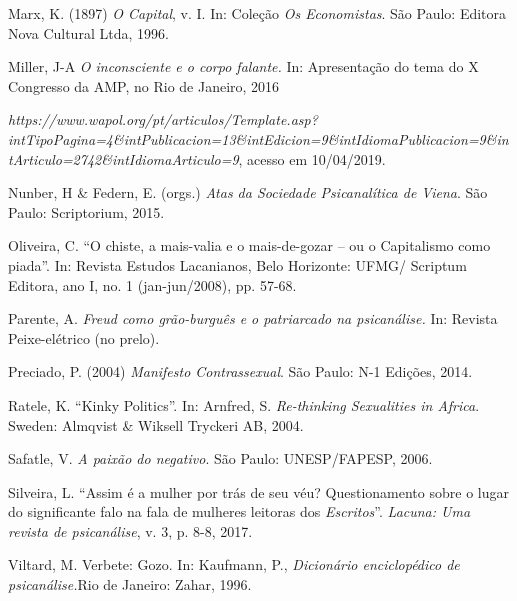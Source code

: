 Marx, K. (1897) \emph{O Capital}, v. I. In: Coleção \emph{Os
Economistas}. São Paulo: Editora Nova Cultural Ltda, 1996.

Miller, J-A \emph{O inconsciente e o corpo falante.} In: Apresentação do
tema do X Congresso da AMP, no Rio de Janeiro, 2016

\emph{https://www.wapol.org/pt/articulos/Template.asp?intTipoPagina=4\&intPublicacion=13\&intEdicion=9\&intIdiomaPublicacion=9\&intArticulo=2742\&intIdiomaArticulo=9},
acesso em 10/04/2019.

Nunber, H \& Federn, E. (orgs.) \emph{Atas da Sociedade Psicanalítica de
Viena}. São Paulo: Scriptorium, 2015.

Oliveira, C. ``O chiste, a mais-valia e o mais-de-gozar -- ou o
Capitalismo como piada''. In: Revista Estudos Lacanianos, Belo
Horizonte: UFMG/ Scriptum Editora, ano I, no. 1 (jan-jun/2008), pp.
57-68.

Parente, A. \emph{Freud como grão-burguês e o patriarcado na
psicanálise.} In: Revista Peixe-elétrico (no prelo).

Preciado, P. (2004) \emph{Manifesto Contrassexual}. São Paulo: N-1
Edições, 2014.

Ratele, K. ``Kinky Politics''. In: Arnfred, S. \emph{Re-thinking
Sexualities in Africa}. Sweden: Almqvist \& Wiksell Tryckeri AB, 2004.

Safatle, V. \emph{A paixão do negativo}. São Paulo: UNESP/FAPESP, 2006.

Silveira, L. ``Assim é a mulher por trás de seu véu? Questionamento
sobre o lugar do significante falo na fala de mulheres leitoras dos
\emph{Escritos}''. \emph{Lacuna: Uma revista de psicanálise}, v. 3, p.
8-8, 2017.

Viltard, M. Verbete: Gozo. In: Kaufmann, P., \emph{Dicionário
enciclopédico de psicanálise.}Rio de Janeiro: Zahar, 1996.

